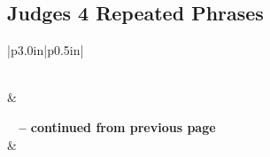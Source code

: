 \subsection{Judges 4 Repeated Phrases}


\normalsize
 
\begin{center}
\begin{longtable}{|p{3.0in}|p{0.5in}|}
\caption[Judges 4 Repeated Phrases]{Judges 4 Repeated Phrases}\label{table:Repeated Phrases Judges 4} \\
\hline {} &  \\ \hline 
\endfirsthead
 
{{\bfseries \tablename\ \thetable{} -- continued from previous page}} \\  
\hline {} &  \\ \hline 
\endhead
 

\end{longtable}
\end{center}
